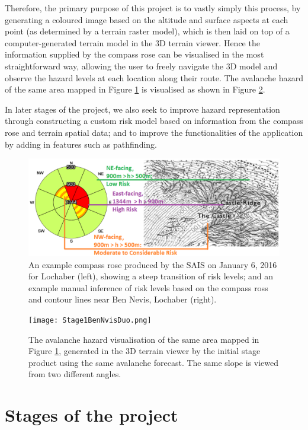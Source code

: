 \documentclass[openany]{UoYCSproject}
\begin{document}
Therefore, the primary purpose of this project is to vastly simply this process, by generating a coloured image based on the altitude and surface aspects at each point (as determined by a terrain raster model), which is then laid on top of a computer-generated terrain model in the 3D terrain viewer. Hence the information supplied by the compass rose can be visualised in the most straightforward way, allowing the user to freely navigate the 3D model and observe the hazard levels at each location along their route. The avalanche hazard of the same area mapped in Figure \ref{fig:mapping} is visualised as shown in Figure \ref{fig:stage1bennevis}.

In later stages of the project, we also seek to improve hazard representation through constructing a custom risk model based on information from the compass rose and terrain spatial data; and to improve the functionalities of the application by adding in features such as pathfinding.

\begin{figure}[h]
		\centering
		\includegraphics[scale=1]{Mapping.png}
		\caption{\label{fig:mapping} An example compass rose produced by the SAIS on January 6, 2016 for Lochaber (left), showing a steep transition of risk levels; and an example manual inference of risk levels based on the compass ross and contour lines near Ben Nevis, Lochaber (right).  \cite{sais-lochaber0106}}
\end{figure}

\begin{figure}[h]
		\centering
		\texttt{[image: Stage1BenNvisDuo.png]}
		\caption{\label{fig:stage1bennevis} The avalanche hazard visualisation of the same area mapped in Figure \ref{fig:mapping}, generated in the 3D terrain viewer by the initial stage product using the same avalanche forecast. The same slope is viewed from two different angles.}
\end{figure}



\section{Stages of the project}
\end{document}
